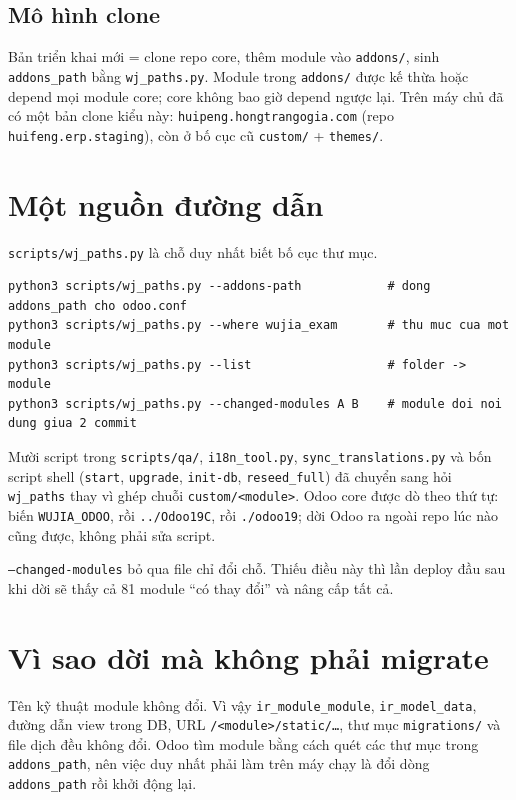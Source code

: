 \subsection{Mô hình clone}

Bản triển khai mới = clone repo core, thêm module vào \texttt{addons/}, sinh \texttt{addons\_path} bằng
\texttt{wj\_paths.py}. Module trong \texttt{addons/} được kế thừa hoặc depend mọi module core; core không bao giờ
depend ngược lại. Trên máy chủ đã có một bản clone kiểu này: \texttt{huipeng.hongtrangogia.com} (repo
\texttt{huifeng.erp.staging}), còn ở bố cục cũ \texttt{custom/} + \texttt{themes/}.

\section{Một nguồn đường dẫn}

\texttt{scripts/wj\_paths.py} là chỗ duy nhất biết bố cục thư mục.

\begin{lstlisting}[style=shell]
python3 scripts/wj_paths.py --addons-path            # dong addons_path cho odoo.conf
python3 scripts/wj_paths.py --where wujia_exam       # thu muc cua mot module
python3 scripts/wj_paths.py --list                   # folder -> module
python3 scripts/wj_paths.py --changed-modules A B    # module doi noi dung giua 2 commit
\end{lstlisting}

Mười script trong \texttt{scripts/qa/}, \texttt{i18n\_tool.py}, \texttt{sync\_translations.py} và bốn script shell
(\texttt{start}, \texttt{upgrade}, \texttt{init-db}, \texttt{reseed\_full}) đã chuyển sang hỏi \texttt{wj\_paths}
thay vì ghép chuỗi \texttt{custom/<module>}. Odoo core được dò theo thứ tự: biến \texttt{WUJIA\_ODOO}, rồi
\texttt{../Odoo19C}, rồi \texttt{./odoo19}; dời Odoo ra ngoài repo lúc nào cũng được, không phải sửa script.

\texttt{--changed-modules} bỏ qua file chỉ đổi chỗ. Thiếu điều này thì lần deploy đầu sau khi dời sẽ thấy cả 81
module ``có thay đổi'' và nâng cấp tất cả.

\section{Vì sao dời mà không phải migrate}

Tên kỹ thuật module không đổi. Vì vậy \texttt{ir\_module\_module}, \texttt{ir\_model\_data}, đường dẫn view trong
DB, URL \texttt{/<module>/static/\ldots}, thư mục \texttt{migrations/} và file dịch đều không đổi. Odoo tìm module
bằng cách quét các thư mục trong \texttt{addons\_path}, nên việc duy nhất phải làm trên máy chạy là đổi dòng
\texttt{addons\_path} rồi khởi động lại.

